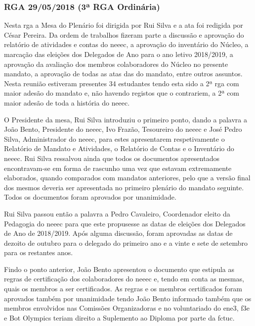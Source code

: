 
\subsubsection{RGA 29/05/2018 (3ª RGA Ordinária)}

Nesta \acrshort{rga} a Mesa do Plenário foi dirigida por Rui Silva e a ata foi redigida por César Pereira. Da ordem de trabalhos fizeram parte a discussão e aprovação do relatório de atividades e contas do \acrshort{neeec}, a aprovação do inventário do Núcleo, a marcação das eleições dos Delegados de Ano para o ano letivo 2018/2019, a aprovação da avaliação dos membros colaboradores do Núcleo no presente mandato, a aprovação de todas as atas das  do mandato, entre outros assuntos. Nesta reunião estiveram presentes 34 estudantes tendo esta sido a 2ª \acrshort{rga} com maior adesão do mandato e, não havendo registos que o contrariem, a 2ª com maior adesão de toda a história do \acrshort{neeec}.

O Presidente da mesa, Rui Silva introduziu o primeiro ponto, dando a palavra a João Bento, Presidente do \acrshort{neeec}, Ivo Frazão, Tesoureiro do \acrshort{neeec} e José Pedro Silva, Administrador do \acrshort{neeec}, para estes apresentarem respetivamente o Relatório de Mandato e Atividades, o Relatório de Contas e o Inventário do \acrshort{neeec}. Rui Silva ressalvou ainda que todos os documentos apresentados encontravam-se em forma de rascunho uma vez que estavam extremamente elaborados, quando comparados com mandatos anteriores, pelo que a versão final dos mesmos deveria ser apresentada no primeiro plenário do mandato seguinte. Todos os documentos foram aprovados por unanimidade.

Rui Silva passou então a palavra a Pedro Cavaleiro, Coordenador eleito da Pedagogia do \acrshort{neeec} para que este propusesse as datas de eleições dos Delegados de Ano de 2018/2019. Após alguma discussão, foram aprovadas as datas de dezoito de outubro para o delegado do primeiro ano e a vinte e sete de setembro para os restantes anos.

Findo o ponto anterior, João Bento apresentou o documento que estipula as regras de certificação dos colaboradores do \acrshort{neeec} e, tendo em conta as mesmas, quais os membros a ser certificados. As regras e os membros certificados foram aprovados também por unanimidade tendo João Bento informado também que os membros envolvidos nas Comissões Organizadoras e no voluntariado do \acrshort{ene3}, \acrshort{f3e} e Bot Olympics teriam direito a Suplemento ao Diploma por parte da \acrshort{fctuc}.

